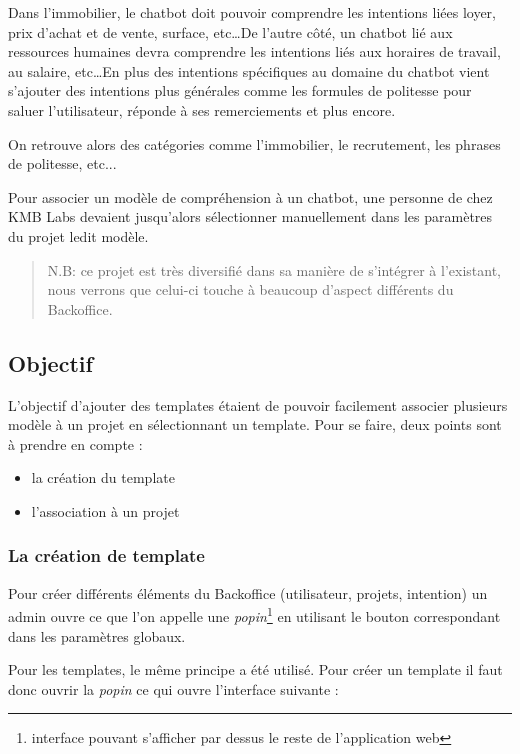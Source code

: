 \documentclass[12pt,a4paper,oneside]{scrreprt}
\begin{document}
Dans l'immobilier, le chatbot doit pouvoir comprendre les intentions liées loyer, prix d'achat et de vente, surface, etc\dots De l'autre côté, un chatbot lié aux ressources humaines devra comprendre les intentions liés aux horaires de travail, au salaire, etc\dots En plus des intentions spécifiques au domaine du chatbot vient s'ajouter des intentions plus générales comme les formules de politesse pour saluer l'utilisateur, réponde à ses remerciements et plus encore.

On retrouve alors des catégories comme l'immobilier, le recrutement, les phrases de politesse, etc...

\begin{problem}
Pour associer un modèle de compréhension à un chatbot, une personne de chez KMB Labs devaient jusqu'alors sélectionner manuellement dans les paramètres du projet ledit modèle.
\end{problem}

\begin{quote}
N.B: ce projet est très diversifié dans sa manière de s'intégrer à l'existant, nous verrons que celui-ci touche à beaucoup d'aspect différents du Backoffice.
\end{quote}

\newpage
\subsection{Objectif}

L'objectif d'ajouter des templates étaient de pouvoir facilement associer plusieurs modèle à un projet en sélectionnant un template. Pour se faire, deux points sont à prendre en compte :
\begin{itemize}
	\item la création du template
	\item l'association à un projet
\end{itemize}

\subsubsection{La création de template}

Pour créer différents éléments du Backoffice (utilisateur, projets, intention) un admin ouvre ce que l'on appelle une \textit{popin}\footnote{interface pouvant s'afficher par dessus le reste de l'application web} en utilisant le bouton correspondant dans les paramètres globaux.

Pour les templates, le même principe a été utilisé. Pour créer un template il faut donc ouvrir la \textit{popin} ce qui ouvre l'interface suivante :
\end{document}
